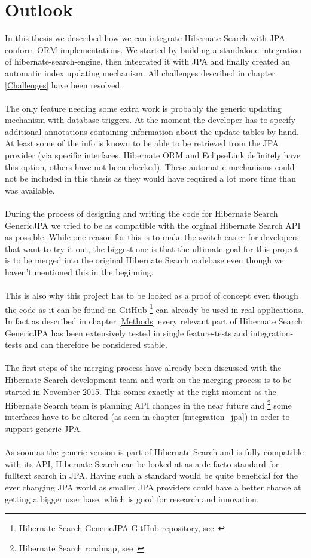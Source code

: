 \section{Outlook}\label{outlook}

In this thesis we described how we can integrate Hibernate Search with JPA conform ORM implementations. We started by building a standalone integration of hibernate-search-engine, then integrated it with JPA and finally created an automatic index updating mechanism. All challenges described in chapter \ref{Challenges} have been resolved.
\\\\
The only feature needing some extra work is probably the generic updating mechanism with database triggers. At the moment the developer has to specify additional annotations containing information about the update tables by hand. At least some of the info is known to be able to be retrieved from the JPA provider (via specific interfaces, Hibernate ORM and EclipseLink definitely have this option, others have not been checked). These automatic mechanisms could not be included in this thesis as they would have required a lot more time than was available.
\\\\
During the process of designing and writing the code for Hibernate Search GenericJPA we tried to be as compatible with the orginal Hibernate Search API as possible. While one reason for this is to make the switch easier for developers that want to try it out, the biggest one is that the ultimate goal for this project is to be merged into the original Hibernate Search codebase even though we haven't mentioned this in the beginning.
\\\\
This is also why this project has to be looked as a proof of concept even though the code as it can be found on GitHub \footnote{Hibernate Search GenericJPA GitHub repository, see~\cite{hibernate_genericjpa_github}} can already be used in real applications. In fact as described in chapter \ref{Methods} every relevant part of Hibernate Search GenericJPA has been extensively tested in single feature-tests and integration-tests and can therefore be considered stable. 
\\\\
The first steps of the merging process have already been discussed with the Hibernate Search development team and work on the merging process is to be started in November 2015. This comes exactly at the right moment as the Hibernate Search team is planning API changes in the near future and \footnote{Hibernate Search roadmap, see~\cite{hibernate_search_roadmap}} some interfaces have to be altered (as seen in chapter \ref{integration_jpa}) in order to support generic JPA.
\\\\
As soon as the generic version is part of Hibernate Search and is fully compatible with its API, Hibernate Search can be looked at as a de-facto standard for fulltext search in JPA. Having such a standard would be quite beneficial for the ever changing JPA world as smaller JPA providers could have a better chance at getting a bigger user base, which is good for research and innovation.